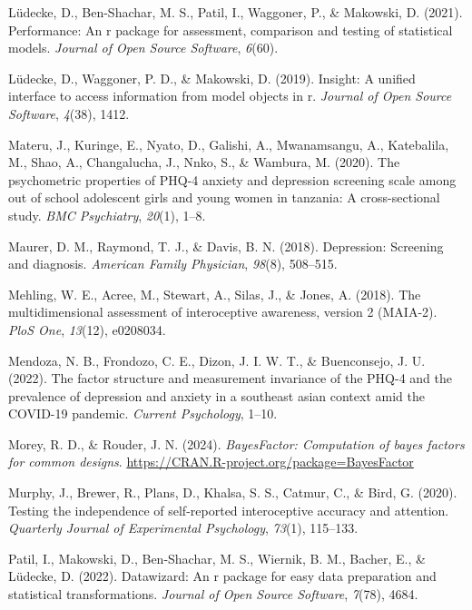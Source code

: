 \documentclass[
  man,
  floatsintext,
  longtable,
  nolmodern,
  notxfonts,
  notimes,
  colorlinks=true,linkcolor=blue,citecolor=blue,urlcolor=blue]{apa7}
\newlength{\cslhangindent}
\newenvironment{CSLReferences}[2] %
 {\begin{list}{}{%
  \setlength{\itemindent}{0pt}
  \setlength{\leftmargin}{0pt}
  \setlength{\parsep}{0pt}
  \ifodd #1
   \setlength{\leftmargin}{\cslhangindent}
   \setlength{\itemindent}{-1\cslhangindent}
  \fi
  \setlength{\itemsep}{#2\baselineskip}}}
 {\end{list}}
\begin{document}
\begin{CSLReferences}{1}{0}
Lüdecke, D., Ben-Shachar, M. S., Patil, I., Waggoner, P., \& Makowski,
D. (2021). Performance: An r package for assessment, comparison and
testing of statistical models. \emph{Journal of Open Source Software},
\emph{6}(60).

Lüdecke, D., Waggoner, P. D., \& Makowski, D. (2019). Insight: A unified
interface to access information from model objects in r. \emph{Journal
of Open Source Software}, \emph{4}(38), 1412.

Materu, J., Kuringe, E., Nyato, D., Galishi, A., Mwanamsangu, A.,
Katebalila, M., Shao, A., Changalucha, J., Nnko, S., \& Wambura, M.
(2020). The psychometric properties of PHQ-4 anxiety and depression
screening scale among out of school adolescent girls and young women in
tanzania: A cross-sectional study. \emph{BMC Psychiatry}, \emph{20}(1),
1--8.

Maurer, D. M., Raymond, T. J., \& Davis, B. N. (2018). Depression:
Screening and diagnosis. \emph{American Family Physician}, \emph{98}(8),
508--515.

Mehling, W. E., Acree, M., Stewart, A., Silas, J., \& Jones, A. (2018).
The multidimensional assessment of interoceptive awareness, version 2
(MAIA-2). \emph{PloS One}, \emph{13}(12), e0208034.

Mendoza, N. B., Frondozo, C. E., Dizon, J. I. W. T., \& Buenconsejo, J.
U. (2022). The factor structure and measurement invariance of the PHQ-4
and the prevalence of depression and anxiety in a southeast asian
context amid the COVID-19 pandemic. \emph{Current Psychology}, 1--10.

Morey, R. D., \& Rouder, J. N. (2024). \emph{BayesFactor: Computation of
bayes factors for common designs}.
\url{https://CRAN.R-project.org/package=BayesFactor}

Murphy, J., Brewer, R., Plans, D., Khalsa, S. S., Catmur, C., \& Bird,
G. (2020). Testing the independence of self-reported interoceptive
accuracy and attention. \emph{Quarterly Journal of Experimental
Psychology}, \emph{73}(1), 115--133.

Patil, I., Makowski, D., Ben-Shachar, M. S., Wiernik, B. M., Bacher, E.,
\& Lüdecke, D. (2022). Datawizard: An r package for easy data
preparation and statistical transformations. \emph{Journal of Open
Source Software}, \emph{7}(78), 4684.


\end{CSLReferences}
\end{document}
